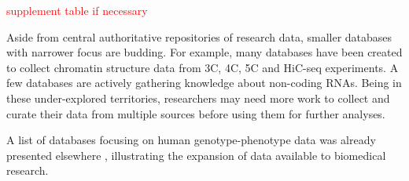 \documentclass[letter]{bioinfo}
\newcommand{\comment}[1]{\textcolor{red}{#1}}
\begin{document}
	\comment{supplement table if necessary}
	
	Aside from central authoritative repositories of research data, smaller databases with narrower focus are budding. For example, many databases have been created to collect chromatin structure data from 3C, 4C, 5C and HiC-seq experiments. A few databases are actively gathering knowledge about non-coding RNAs. Being in these under-explored territories, researchers may need more work to collect and curate their data from multiple sources before using them for further analyses.
	
	
	
	A list of databases focusing on human genotype-phenotype data was already presented elsewhere \citep{Brookes:2015:Human}, illustrating the expansion of data available to biomedical research. 
	
\end{document}
